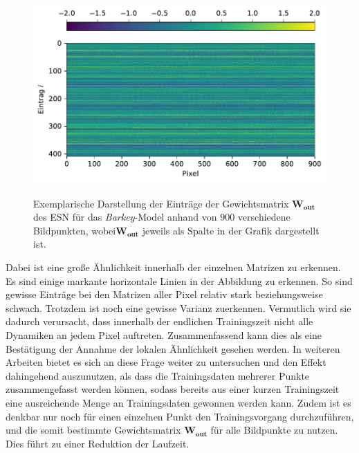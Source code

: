 \begin{figure}[H]
	\centering
	\includegraphics[height=3.0in]{figures/results/cross_prediction/weights.pdf}
	\setcapmargin[1cm]{1cm}
	\caption{Exemplarische Darstellung der Einträge der Gewichtsmatrix $\mathbf{W_{out}}$ des \textsc{ESN} für das \textit{Barkey}-Model anhand von $900$ verschiedene Bildpunkten, wobei$\mathbf{W_{out}}$ jeweils als Spalte in der Grafik dargestellt ist.}
	\label{fig:exp_cross_esn_weights}
\end{figure}

Dabei ist eine große Ähnlichkeit innerhalb der einzelnen Matrizen zu erkennen. Es sind einige markante horizontale Linien in der Abbildung zu erkennen. So sind gewisse Einträge bei den Matrizen aller Pixel relativ stark beziehungsweise schwach. Trotzdem ist noch eine gewisse Varianz zuerkennen. Vermutlich wird sie dadurch verursacht, dass innerhalb der endlichen Trainingszeit nicht alle Dynamiken an jedem Pixel auftreten. Zusammenfassend kann dies als eine Bestätigung der Annahme der lokalen Ähnlichkeit gesehen werden. In weiteren Arbeiten bietet es sich an diese Frage weiter zu untersuchen und den Effekt dahingehend auszunutzen, als dass die Trainingsdaten mehrerer Punkte zusammengefasst werden können, sodass bereits aus einer kurzen Trainingszeit eine ausreichende Menge an Trainingsdaten gewonnen werden kann. Zudem ist es denkbar nur noch für einen einzelnen Punkt den Trainingsvorgang durchzuführen, und die somit bestimmte Gewichtsmatrix $\mathbf{W_{out}}$ für alle Bildpunkte zu nutzen. Dies führt zu einer Reduktion der Laufzeit.

\FloatBarrier
